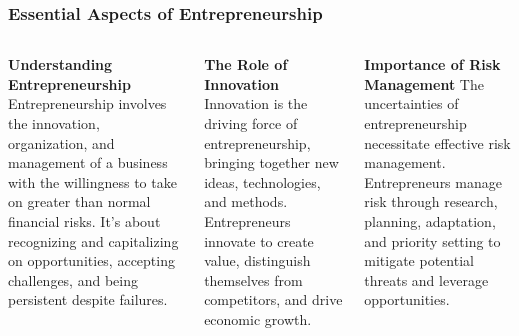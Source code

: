 \documentclass[5pt]{beamer}
\begin{document}
\begin{frame}
\frametitle{Essential Aspects of Entrepreneurship}
\begin{columns}
\begin{column}{0.3\textwidth}
\begin{block}{\textbf{Understanding Entrepreneurship}}
Entrepreneurship involves the innovation, organization, and management of a business with the willingness to take on greater than normal financial risks. It's about recognizing and capitalizing on opportunities, accepting challenges, and being persistent despite failures.
\end{block}
\end{column}
\begin{column}{0.3\textwidth}
\begin{block}{\textbf{The Role of Innovation}}
Innovation is the driving force of entrepreneurship, bringing together new ideas, technologies, and methods. Entrepreneurs innovate to create value, distinguish themselves from competitors, and drive economic growth.
\end{block}
\end{column}
\begin{column}{0.3\textwidth}
\begin{block}{\textbf{Importance of Risk Management}}
The uncertainties of entrepreneurship necessitate effective risk management. Entrepreneurs manage risk through research, planning, adaptation, and priority setting to mitigate potential threats and leverage opportunities.
\end{block}
\end{column}
\end{columns}
\end{frame}
\end{document}
